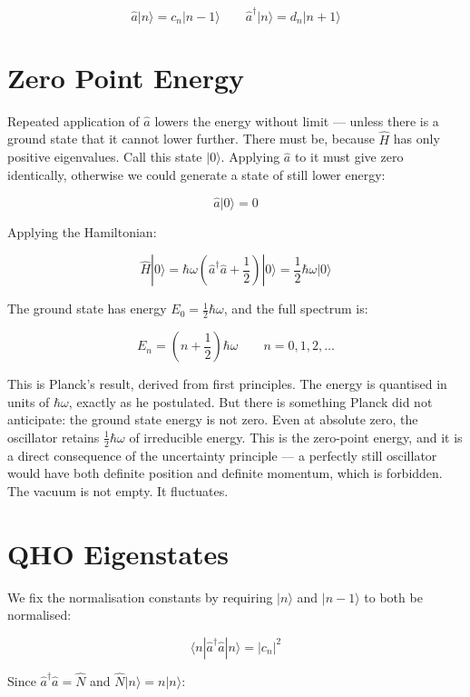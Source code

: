 \documentclass[krantz1,ChapterTOCs]{krantz}
\begin{document}
$$\hat{a}|n\rangle = c_n|n-1\rangle \qquad 
\hat{a}^\dagger|n\rangle = d_n|n+1\rangle$$

\section*{Zero Point Energy}

Repeated application of $\hat{a}$ lowers the energy without 
limit --- unless there is a ground state that it cannot lower 
further. There must be, because $\hat{H}$ has only positive 
eigenvalues. Call this state $|0\rangle$. Applying $\hat{a}$ 
to it must give zero identically, otherwise we could generate 
a state of still lower energy:

$$\hat{a}|0\rangle = 0$$

Applying the Hamiltonian:

$$\hat{H}|0\rangle = \hbar\omega\left(\hat{a}^\dagger\hat{a} 
+ \frac{1}{2}\right)|0\rangle = \frac{1}{2}\hbar\omega|0\rangle$$

The ground state has energy $E_0 = \frac{1}{2}\hbar\omega$, and 
the full spectrum is:

$$\boxed{E_n = \left(n + \frac{1}{2}\right)\hbar\omega \qquad 
n = 0,1,2,\ldots}$$

This is Planck's result, derived from first principles. The 
energy is quantised in units of $\hbar\omega$, exactly as he 
postulated. But there is something Planck did not anticipate: 
the ground state energy is not zero. Even at absolute zero, 
the oscillator retains $\frac{1}{2}\hbar\omega$ of irreducible 
energy. This is the zero-point energy, and it is a direct 
consequence of the uncertainty principle --- a perfectly still 
oscillator would have both definite position and definite 
momentum, which is forbidden.\\

The vacuum is not empty. It fluctuates.\\

\section*{QHO Eigenstates}

We fix the normalisation constants by requiring $|n\rangle$ 
and $|n-1\rangle$ to both be normalised:

$$\langle n|\hat{a}^\dagger\hat{a}|n\rangle = |c_n|^2$$

Since $\hat{a}^\dagger\hat{a} = \hat{N}$ and 
$\hat{N}|n\rangle = n|n\rangle$:
\end{document}
